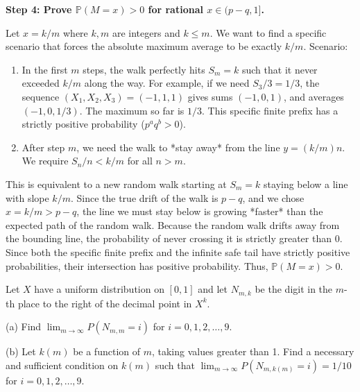 \begin{solution}
\textbf{Step 4: Prove $\mathbb{P}(M = x) > 0$ for rational $x \in (p-q, 1]$.}

Let $x = k/m$ where $k, m$ are integers and $k \leq m$. We want to find a specific scenario that forces the absolute maximum average to be exactly $k/m$.
Scenario:
\begin{enumerate}
    \item In the first $m$ steps, the walk perfectly hits $S_m = k$ such that it never exceeded $k/m$ along the way. For example, if we need $S_3/3 = 1/3$, the sequence $(X_1, X_2, X_3) = (-1, 1, 1)$ gives sums $(-1, 0, 1)$, and averages $(-1, 0, 1/3)$. The maximum so far is $1/3$. This specific finite prefix has a strictly positive probability ($p^a q^b > 0$).
    \item After step $m$, we need the walk to *stay away* from the line $y = (k/m)n$. We require $S_n/n < k/m$ for all $n > m$.
\end{enumerate}
This is equivalent to a new random walk starting at $S_m=k$ staying below a line with slope $k/m$.
Since the true drift of the walk is $p-q$, and we chose $x = k/m > p-q$, the line we must stay below is growing *faster* than the expected path of the random walk.
Because the random walk drifts away from the bounding line, the probability of never crossing it is strictly greater than 0.
Since both the specific finite prefix and the infinite safe tail have strictly positive probabilities, their intersection has positive probability. Thus, $\mathbb{P}(M = x) > 0$.
\end{solution}

\begin{exercise}\label{probability:2022:3}
Let $X$ have a uniform distribution on $[0,1]$ and let $N_{m,k}$ be the digit in the $m$-th place to the right of the decimal point in $X^k$.

(a) Find $\lim_{m \to \infty} P(N_{m,m} = i)$ for $i = 0, 1, 2, \ldots, 9$.

(b) Let $k(m)$ be a function of $m$, taking values greater than 1. Find a necessary and sufficient condition on $k(m)$ such that $\lim_{m \to \infty} P(N_{m,k(m)} = i) = 1/10$ for $i = 0, 1, 2, \ldots, 9$.
\end{exercise}

